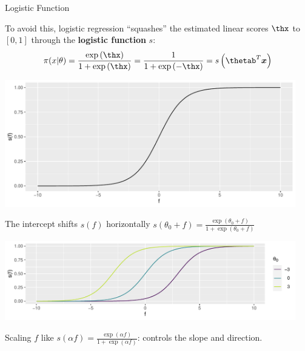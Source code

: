 \documentclass[11pt,compress,t,notes=noshow, xcolor=table]{beamer}
\newenvironment{knitrout}{}{} %
\begin{document}
\begin{vbframe}{Logistic Function}

To avoid this, logistic regression \enquote{squashes} the estimated linear scores $\thx$ to $[0,1]$ through the \textbf{logistic function} $s$:
\[
\pixt = \frac{\exp\left( \thx \right)}{1+\exp\left(\thx \right)} = \frac{1}{1+\exp\left( -\thx \right)} = s\left( \thetab^T \xv \right)
\]

\begin{knitrout}\scriptsize
{}\color{fgcolor}

{\centering \includegraphics[width=0.95\textwidth]{figure/reg_class_log_1} 

}



\end{knitrout}

\framebreak
The intercept shifts $s(f)$ horizontally $s(\theta_0 + f) = \frac{\exp(\theta_0 + f)}{1+\exp(\theta_0 + f)}$
\begin{knitrout}\scriptsize
{}\color{fgcolor}

{\centering \includegraphics[width=0.95\textwidth]{figure/reg_class_log_2}  

}



\end{knitrout}

Scaling $f$ like $s(\alpha f) = \frac{\exp(\alpha f)}{1+\exp(\alpha f)}$: controls the slope and direction.
\lz
\begin{knitrout}\scriptsize
{}\color{fgcolor}


\end{knitrout}
\end{vbframe}
\end{document}

